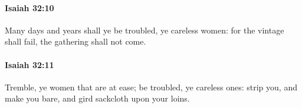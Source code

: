 		\paragraph{Isaiah 32:10} %
			\label{ISAIAH-32-10}

			Many days and years shall ye be troubled, ye careless women: for the vintage shall fail, the gathering shall not come.


		\paragraph{Isaiah 32:11} %
			\label{ISAIAH-32-11}

			Tremble, ye women that are at ease; be troubled, ye careless ones: strip you, and make you bare, and gird sackcloth upon your loins.


